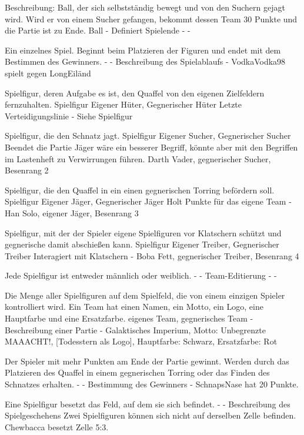 {Beschreibung: Ball, der sich selbstständig bewegt und von den Suchern gejagt wird. Wird er von einem Sucher gefangen, bekommt dessen Team 30 Punkte und die Partie ist zu Ende.}
{Ball}
{-}
{Definiert Spielende}
{-}
{-}

{Ein einzelnes Spiel. Beginnt beim Platzieren der Figuren und endet mit dem Bestimmen des Gewinners.}
{-}
{-}
{Beschreibung des Spielablaufs}
{-}
{VodkaVodka98 spielt gegen LongEiländ}

{Spielfigur, deren Aufgabe es ist, den Quaffel von den eigenen Zielfeldern fernzuhalten.}
{Spielfigur}
{Eigener Hüter, Gegnerischer Hüter}
{Letzte Verteidigungslinie}
{-}
{Siehe \glqq{}Spielfigur\grqq{} }

{Spielfigur, die den Schnatz jagt.}
{Spielfigur}
{Eigener Sucher, Gegnerischer Sucher}
{Beendet die Partie}
{\glqq{}Jäger\grqq{}  wäre ein besserer Begriff, könnte aber mit den Begriffen im Lastenheft zu Verwirrungen führen.}
{Darth Vader, gegnerischer Sucher, Besenrang 2}

{Spielfigur, die den Quaffel in ein einen gegnerischen Torring befördern soll.}
{Spielfigur}
{Eigener Jäger, Gegnerischer Jäger}
{Holt Punkte für das eigene Team}
{-}
{Han Solo, eigener Jäger, Besenrang 3}

{Spielfigur, mit der der Spieler eigene Spielfiguren vor Klatschern schützt und gegnerische damit abschießen kann.}
{Spielfigur}
{Eigener Treiber, Gegnerischer Treiber}
{Interagiert mit Klatschern}
{-}
{Boba Fett, gegnerischer Treiber, Besenrang 4}

{Jede Spielfigur ist entweder männlich oder weiblich.}
{-}
{-}
{Team-Editierung}
{-}
{-}

{Die Menge aller Spielfiguren auf dem Spielfeld, die von einem einzigen Spieler kontrolliert wird. Ein Team hat einen Namen, ein Motto, ein Logo, eine Hauptfarbe und eine Ersatzfarbe.}
{eigenes Team, gegnerisches Team}
{-}
{Beschreibung einer Partie}
{-}
{Galaktisches Imperium, Motto: \glqq{}Unbegrenzte MAAACHT!\grqq{}, [Todesstern als Logo], Hauptfarbe: Schwarz, Ersatzfarbe: Rot}

{Der Spieler mit mehr Punkten am Ende der Partie gewinnt. Werden durch das Platzieren des Quaffel in einem gegnerischen Torring oder das Finden des Schnatzes erhalten.}
{-}
{-}
{Bestimmung des Gewinners}
{-}
{SchnapsNase hat 20 Punkte.}

{Eine Spielfigur besetzt das Feld, auf dem sie sich befindet.}
{-}
{-}
{Beschreibung des Spielgeschehens}
{Zwei Spielfiguren können sich nicht auf derselben Zelle befinden.}
{Chewbacca besetzt Zelle 5:3.}

